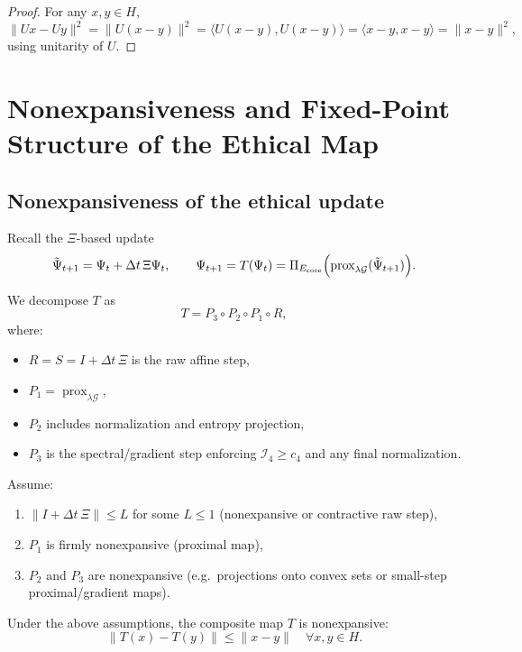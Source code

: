 \documentclass[11pt]{article}
\begin{document}
\begin{proof}
For any $x,y\in H$,
\[
  \|Ux-Uy\|^2 = \|U(x-y)\|^2 = \langle U(x-y),U(x-y)\rangle
  = \langle x-y,x-y\rangle = \|x-y\|^2,
\]
using unitarity of $U$.
\end{proof}

\section{Nonexpansiveness and Fixed-Point Structure of the Ethical Map}

\subsection{Nonexpansiveness of the ethical update}

Recall the $\Xi$-based update
\[
  \tilde{\Psi}_{t+1} = \Psi_t + \Delta t\,\Xi\Psi_t, \qquad
  \Psi_{t+1} = T(\Psi_t)
  = \Pi_{E_{\mathrm{core}}}\Bigl(\operatorname{prox}_{\lambda\mathcal{G}}(\tilde{\Psi}_{t+1})\Bigr).
\]

We decompose $T$ as
\[
  T = P_3 \circ P_2 \circ P_1 \circ R,
\]
where:
\begin{itemize}[leftmargin=*]
  \item $R = S = I + \Delta t\,\Xi$ is the raw affine step,
  \item $P_1 = \operatorname{prox}_{\lambda\mathcal{G}}$,
  \item $P_2$ includes normalization and entropy projection,
  \item $P_3$ is the spectral/gradient step enforcing $\mathcal{I}_4\ge c_4$ and any final normalization.
\end{itemize}

Assume:
\begin{enumerate}[label=(\roman*),leftmargin=*]
  \item $\|I + \Delta t\,\Xi\|\le L$ for some $L\le 1$ (nonexpansive or contractive raw step),
  \item $P_1$ is firmly nonexpansive (proximal map),
  \item $P_2$ and $P_3$ are nonexpansive (e.g.\ projections onto convex sets or small-step proximal/gradient maps).
\end{enumerate}

\begin{proposition}
Under the above assumptions, the composite map $T$ is nonexpansive:
\[
  \|T(x)-T(y)\| \le \|x-y\|\quad\forall x,y\in H.
\]
\end{proposition}
\end{document}
